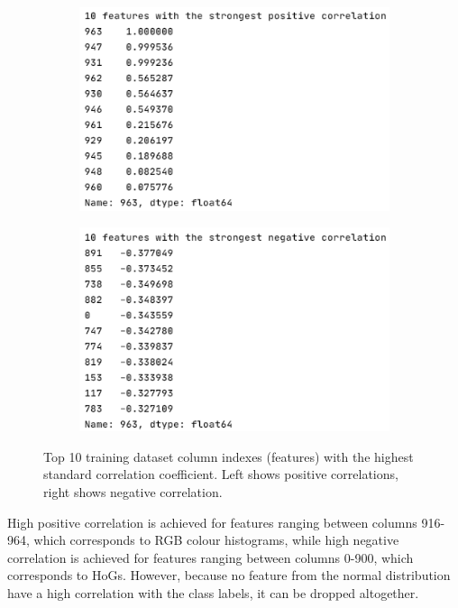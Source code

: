 \documentclass[letterpaper,12pt]{article}
\begin{document}
\begin{figure}[h]
\centering
\begin{subfigure}{.49\textwidth}
  \centering
  \includegraphics[width=\textwidth]{report/figures/corr_pos.png}
  \label{fig:corr_pos}
\end{subfigure}%
\begin{subfigure}{.5\textwidth}
  \centering
  \includegraphics[width=\textwidth]{report/figures/corr_neg.png}
  \label{fig:corr_neg}
\end{subfigure}
\caption{\label{fig:correlation-results}Top 10 training dataset column indexes (features) with the highest standard correlation coefficient. Left shows positive correlations, right shows negative correlation.}
\end{figure}

High positive correlation is achieved for features ranging between columns 916-964, which corresponds to RGB colour histograms, while high negative correlation is achieved for features ranging between columns 0-900, which corresponds to HoGs. However, because no feature from the normal distribution have a high correlation  with the class labels, it can be dropped altogether.
\end{document}
